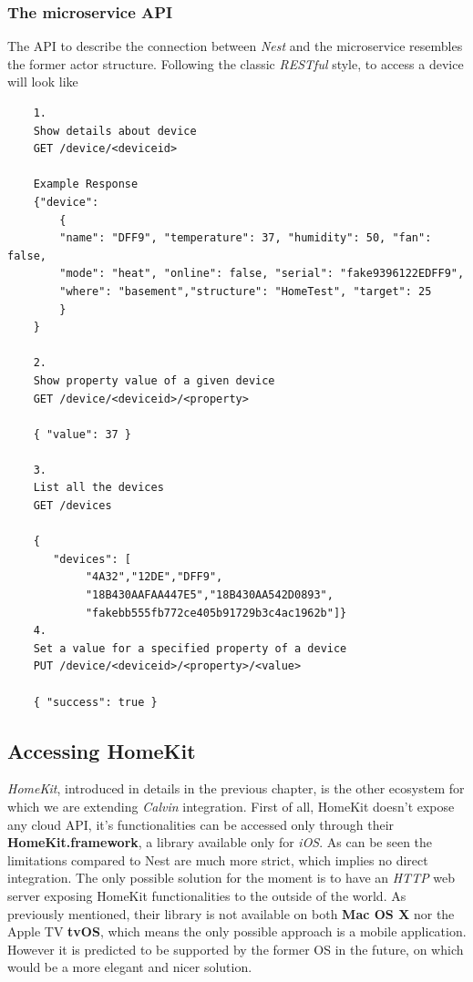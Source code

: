 \subsubsection{The microservice API}

The API to describe the connection between \textit{Nest} and the microservice
resembles the former actor structure.
Following the classic \textit{RESTful} style, to access a device will look like
\pagebreak
\begin{verbatim}
    1.
    Show details about device
    GET /device/<deviceid>

    Example Response
    {"device":
        {
        "name": "DFF9", "temperature": 37, "humidity": 50, "fan": false,
        "mode": "heat", "online": false, "serial": "fake9396122EDFF9",
        "where": "basement","structure": "HomeTest", "target": 25
        }
    }

    2.
    Show property value of a given device
    GET /device/<deviceid>/<property>

    { "value": 37 }

    3.
    List all the devices
    GET /devices

    {
       "devices": [
            "4A32","12DE","DFF9",
            "18B430AAFAA447E5","18B430AA542D0893",
            "fakebb555fb772ce405b91729b3c4ac1962b"]}
    4.
    Set a value for a specified property of a device
    PUT /device/<deviceid>/<property>/<value>

    { "success": true }
\end{verbatim}




\pagebreak
\subsection{Accessing HomeKit}

\textit{HomeKit}, introduced in details in the previous chapter, is the other ecosystem
for which we are extending \textit{Calvin} integration. First of all, HomeKit doesn't
expose any cloud API, it's functionalities can be accessed only through their \textbf{HomeKit.framework},
a library available only for \textit{iOS}. As can be seen the limitations compared to Nest
are much more strict, which implies no direct integration. The only possible solution for the
moment is to have an \textit{HTTP} web server exposing HomeKit functionalities to the outside of
the world. As previously mentioned, their library is not available on both \textbf{Mac OS X} nor
the Apple TV \textbf{tvOS}, which means the only possible approach is a mobile application.
However it is predicted to be supported by the former OS in the future, on which would be a more
elegant and nicer solution.\\

